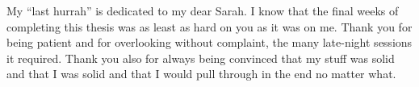 	My ``last hurrah'' is dedicated to my dear Sarah. I know that the final weeks of completing this thesis was as least as hard on you as it was on me. Thank you for being patient and for overlooking without complaint, the many late-night sessions it required. Thank you also for always being convinced that my stuff was solid and that I was solid and that I would pull through in the end no matter what.










	\vfill